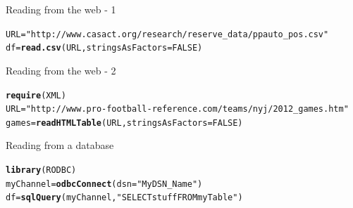 \documentclass[xcolor=dvipsnames]{beamer}
\makeatletter
\newcommand{\hlnum}[1]{\textcolor[rgb]{0.686,0.059,0.569}{#1}}%
\newcommand{\hlstr}[1]{\textcolor[rgb]{0.192,0.494,0.8}{#1}}%
\newcommand{\hlstd}[1]{\textcolor[rgb]{0.345,0.345,0.345}{#1}}%
\newcommand{\hlkwb}[1]{\textcolor[rgb]{0.69,0.353,0.396}{#1}}%
\newcommand{\hlkwc}[1]{\textcolor[rgb]{0.333,0.667,0.333}{#1}}%
\newcommand{\hlkwd}[1]{\textcolor[rgb]{0.737,0.353,0.396}{\textbf{#1}}}%
\newenvironment{kframe}{%
 \def\at@end@of@kframe{}%
 \ifinner\ifhmode%
  \def\at@end@of@kframe{\end{minipage}}%
  \begin{minipage}{\columnwidth}%
 \fi\fi%
 \def\FrameCommand##1{\hskip\@totalleftmargin \hskip-\fboxsep
 \colorbox{shadecolor}{##1}\hskip-\fboxsep
     \hskip-\linewidth \hskip-\@totalleftmargin \hskip\columnwidth}%
 \MakeFramed {\advance\hsize-\width
   \@totalleftmargin\z@ \linewidth\hsize
   \@setminipage}}%
 {\par\unskip\endMakeFramed%
 \at@end@of@kframe}
\newenvironment{knitrout}{}{} %
\makeatother
\begin{document}
\begin{frame}[fragile]{Reading from the web - 1}
\begin{knitrout}\tiny
{}\color{fgcolor}\begin{kframe}
\begin{alltt}
\hlstd{URL} \hlkwb{=} \hlstr{"http://www.casact.org/research/reserve_data/ppauto_pos.csv"}
\hlstd{df} \hlkwb{=} \hlkwd{read.csv}\hlstd{(URL,} \hlkwc{stringsAsFactors} \hlstd{=} \hlnum{FALSE}\hlstd{)}
\end{alltt}
\end{kframe}
\end{knitrout}

\end{frame}

\begin{frame}[fragile]{Reading from the web - 2}
\begin{knitrout}\tiny
{}\color{fgcolor}\begin{kframe}
\begin{alltt}
\hlkwd{require}\hlstd{(XML)}
\hlstd{URL} \hlkwb{=} \hlstr{"http://www.pro-football-reference.com/teams/nyj/2012_games.htm"}
\hlstd{games} \hlkwb{=} \hlkwd{readHTMLTable}\hlstd{(URL,} \hlkwc{stringsAsFactors} \hlstd{=} \hlnum{FALSE}\hlstd{)}
\end{alltt}
\end{kframe}
\end{knitrout}

\end{frame}

\begin{frame}[fragile]{Reading from a database}
\begin{knitrout}
\color{fgcolor}\begin{kframe}
\begin{alltt}
\hlkwd{library}\hlstd{(RODBC)}
\hlstd{myChannel} \hlkwb{=} \hlkwd{odbcConnect}\hlstd{(}\hlkwc{dsn} \hlstd{=} \hlstr{"MyDSN_Name"}\hlstd{)}
\hlstd{df} \hlkwb{=} \hlkwd{sqlQuery}\hlstd{(myChannel,} \hlstr{"SELECT stuff FROM myTable"}\hlstd{)}
\end{alltt}
\end{kframe}
\end{knitrout}

\end{frame}
\end{document}

